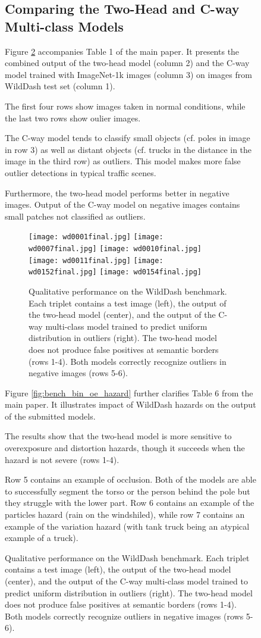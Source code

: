 \documentclass[runningheads]{llncs}
\begin{document}
\begin{figure}[htb]
\subsection{Comparing the Two-Head and 
  C-way Multi-class Models}
Figure \ref{fig:bench_bin_oe_normal} accompanies Table 1
of the main paper. It presents the combined output
of the two-head model (column 2) and the C-way model trained with
ImageNet-1k images (column 3) on images from 
WildDash test set (column 1).

The first four rows show images taken in normal
conditions, while the last two rows
show oulier images.

The C-way model tends to classify
small objects (cf. poles in image in row 3)
as well as distant objects (cf.
trucks in the distance in the image in the third row) 
as outliers. This model makes
more false outlier detections
in typical traffic scenes. 

Furthermore, the two-head model performs 
better in negative images.
Output of the C-way model on negative images
contains small patches not classified as outliers.

\newcommand{\mywt}{0.85\textwidth}
\begin{figure}[htb]
  \centering
  \texttt{[image: wd0001final.jpg]}
  \texttt{[image: wd0007final.jpg]}
  \texttt{[image: wd0010final.jpg]}
  \texttt{[image: wd0011final.jpg]}
  \texttt{[image: wd0152final.jpg]}
  \texttt{[image: wd0154final.jpg]}
  \caption{Qualitative performance 
    on the WildDash benchmark.
    Each triplet contains 
    a test image (left),
    the output of the two-head model (center), 
    and the output of the C-way multi-class model 
    trained to predict uniform distribution 
    in outliers (right).
    The two-head model does not produce
    false positives at semantic borders
    (rows 1-4).
    Both models correctly recognize
    outliers in negative images (rows 5-6).
  }
  \label{fig:bench_bin_oe_normal}
\end{figure}

Figure \ref{fig:bench_bin_oe_hazard} further
clarifies Table 6 from the main paper.
It illustrates impact of WildDash hazards 
on the output of the submitted models.

The results show that the two-head model
is more sensitive to overexposure and distortion
hazards, though it succeeds when the hazard
is not severe (rows 1-4).

Row 5 contains an example of occlusion. Both
of the models are able to successfully 
segment the torso or the person behind the pole but 
they struggle with the lower part.
Row 6 contains an example of the particles hazard
(rain on the windshiled), while
row 7 contains an example of the variation hazard
(with tank truck being an atypical example of a truck).


\end{figure}
\end{document}
